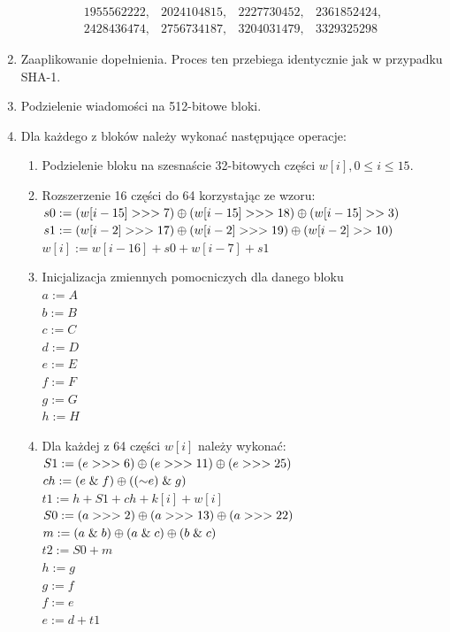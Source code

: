\begin{enumerate}
$$\begin{matrix}
				1955562222, & 2024104815, & 2227730452, & 2361852424, \\
				2428436474, & 2756734187, & 3204031479, & 3329325298
			\end{matrix}
			$$
	\item Zaaplikowanie dopełnienia. Proces ten przebiega identycznie jak w przypadku SHA-1.
	\item Podzielenie wiadomości na 512-bitowe bloki.
	\item Dla każdego z bloków należy wykonać następujące operacje:
		\begin{enumerate}
			\item Podzielenie bloku na szesnaście 32-bitowych części $w[i], 0 \leq i \leq 15$.
			\item Rozszerzenie 16 części do 64 korzystając ze wzoru: \\
				$s0 := (w[i-15] >>> 7) \mathbin{\oplus} (w[i-15] >>> 18) \mathbin{\oplus} (w[i-15] >> 3)$ \\
			    $s1 := (w[i-2] >>> 17) \mathbin{\oplus} (w[i-2] >>> 19) \mathbin{\oplus} (w[i-2] >> 10)$ \\
				$w[i] := w[i-16] + s0 + w[i-7] + s1$
			\item Inicjalizacja zmiennych pomocniczych dla danego bloku \\
				$a := A$ \\
				$b := B$ \\
				$c := C$ \\
				$d := D$ \\
				$e := E$ \\
				$f := F$ \\
				$g := G$ \\
				$h := H$
			\item Dla każdej z 64 części $w[i]$ należy wykonać: \\
				$S1 := (e >>> 6) \mathbin{\oplus} (e >>> 11) \mathbin{\oplus} (e >>> 25)$ \\
		        $ch := (e \mathrel{\&} f) \mathbin{\oplus} ((\mathord{\sim} e) \mathrel{\&} g)$ \\
		        $t1 := h + S1 + ch + k[i] + w[i]$ \\
		        $S0 := (a >>> 2) \mathbin{\oplus} (a >>> 13) \mathbin{\oplus} (a >>> 22)$ \\
		        $m := (a \mathrel{\&} b) \mathbin{\oplus} (a \mathrel{\&} c) \mathbin{\oplus} (b \mathrel{\&} c)$ \\
		        $t2 := S0 + m$ \\
		        $h := g$ \\
		        $g := f$ \\
		        $f := e$ \\
		        $e := d + t1$ \\

\end{enumerate}
\end{enumerate}
